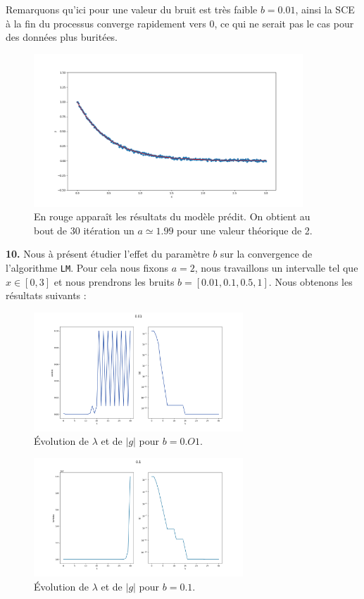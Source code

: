 \documentclass[12pt]{article}
\begin{document}
Remarquons qu'ici pour une valeur du bruit est très faible $b=0.01$, ainsi la SCE à la fin du processus converge rapidement vers 0, ce qui ne serait pas le cas pour des données plus buritées.

\begin{figure}[H]
\centering
\includegraphics[width=0.9\textwidth]{Q9_S.png}
\caption{ En rouge apparaît les résultats du modèle prédit. On obtient au bout de 30 itération un $a \simeq 1.99 $ pour une valeur théorique de 2.}
\label{FigQ9}
\end{figure}
 
\textbf{\color{brick}10.} Nous à présent étudier l'effet du paramètre $b$ sur la convergence de l'algorithme \verb|LM|. Pour cela nous fixons $a=2$, nous travaillons un intervalle tel que $x \in [0,3]$ et nous prendrons les bruits $b=[0.01, 0.1 , 0.5 , 1]$. Nous obtenons les résultats suivants : 

\begin{figure}[H]
\centering
\includegraphics[width=0.7\textwidth]{Q10_B001.png}
\caption{ Évolution de $\lambda$ et de $|g|$ pour $b=0.O1$.}
\label{FigQ9}
\end{figure}


\begin{figure}[H]
\centering
\includegraphics[width=0.7\textwidth]{Q10_B01.png}
\caption{ Évolution de $\lambda$ et de $|g|$ pour $b=0.1$.}
\label{FigQ10B01}
\end{figure}
\end{document}
